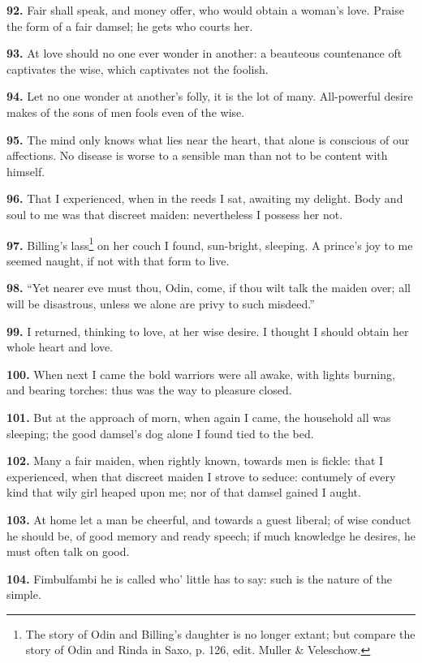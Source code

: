 \textbf{92.} Fair shall speak, and money offer, who would obtain a woman's
love. Praise the form of a fair damsel; he gets who courts her.

\textbf{93.} At love should no one ever wonder in another: a beauteous
countenance oft captivates the wise, which captivates not the foolish.

\textbf{94.} Let no one wonder at another's folly, it is the lot of many.
All-powerful desire makes of the sons of men fools even of the wise.

\textbf{95.} The mind only knows what lies near the heart, that alone is
conscious of our affections. No disease is worse to a sensible man
than not to be content with himself.

\textbf{96.} That I experienced, when in the reeds I sat, awaiting my
delight. Body and soul to me was that discreet maiden: nevertheless I
possess her not.

\textbf{97.} Billing's lass\footnote{The story of Odin and Billing's daughter is no longer
extant; but compare the story of Odin and Rinda in Saxo, p. 126, edit.
Muller \& Veleschow.} on her couch I found, sun-bright, sleeping. A
prince's joy to me seemed naught, if not with that form to live.

\textbf{98.} ``Yet nearer eve must thou, Odin, come, if thou wilt talk the
maiden over; all will be disastrous, unless we alone are privy to such
misdeed.''

\textbf{99.} I returned, thinking to love, at her wise desire. I thought I
should obtain her whole heart and love.

\textbf{100.} When next I came the bold warriors were all awake, with lights
burning, and bearing torches: thus was the way to pleasure closed.

\textbf{101.} But at the approach of morn, when again I came, the household
all was sleeping; the good damsel's dog alone I found tied to the bed.

\textbf{102.} Many a fair maiden, when rightly known, towards men is fickle:
that I experienced, when that discreet maiden I strove to seduce:
contumely of every kind that wily girl heaped upon me; nor of that
damsel gained I aught.

\textbf{103.} At home let a man be cheerful, and towards a guest liberal; of
wise conduct he should be, of good memory and ready speech; if much
knowledge he desires, he must often talk on good.

\textbf{104.} Fimbulfambi he is called who' little has to say: such is the
nature of the simple.

